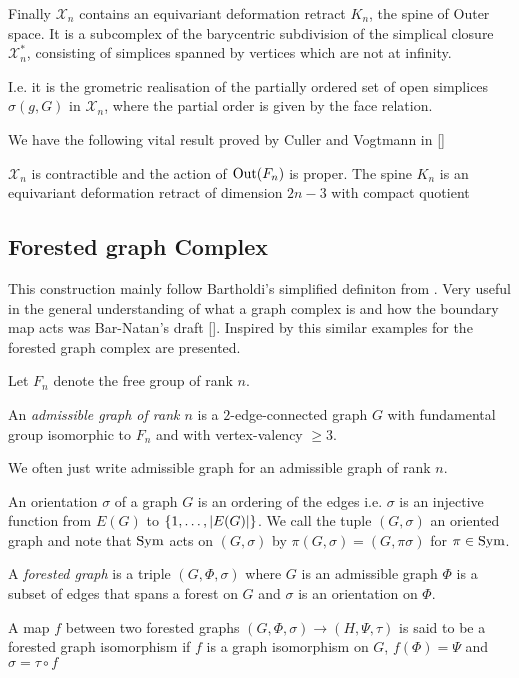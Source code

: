  Finally $\mathcal{X}_{n}$ contains an equivariant deformation retract $K_{n}$, the spine of Outer space.
 It is a subcomplex of the barycentric subdivision of the simplical closure $\mathcal{X}_{n}^{*}$, consisting of simplices spanned by vertices which are not at infinity.

 I.e. it is the grometric realisation of the partially ordered set of open simplices $\sigma(g,G)$ in $\mathcal{X}_{n}$, where 
 the partial order is given by the face relation.

 We have the following vital result proved by Culler and Vogtmann in []
 \begin{theorem}
	 $\mathcal{X}_{n}$ is contractible and the action of $\operatorname{Out}(F_{n})$ is proper.
	 The spine $K_{n}$ is an equivariant deformation retract of dimension $2 n - 3$ with compact quotient
 \end{theorem}

\subsection{Forested graph Complex}
This construction mainly follow Bartholdi's simplified definiton from \cite{bartholdi16}.
Very useful in the general understanding of  what a graph complex is and how the boundary map acts was Bar-Natan's draft [].
Inspired by this similar examples for the forested graph complex are presented.

Let $F_{n}$ denote the free group of rank $n.$
\begin{definition}
	An \emph{admissible graph of rank $n$} is a $2$-edge-connected graph $G$ with fundamental group isomorphic to $F_{n}$ and with vertex-valency $\geq 3$.
\end{definition}


We often just write admissible graph for an admissible graph of rank $n$.

\begin{definition}
	An orientation $\sigma$ of a graph $G$ is an ordering of the edges i.e. $\sigma$ is an injective function from $E(G)$ to $\{1,\ldots,\abs{E(G)}\}$.
	We call the tuple $(G,\sigma)$ an oriented graph and note that $\operatorname{Sym}$ acts on $(G,\sigma)$ by $\pi (G,\sigma) = (G,\pi \sigma)$ for $\pi \in \operatorname{Sym}$.
\end{definition}

\begin{definition}
	A \emph{forested graph} is a triple $(G,\Phi,\sigma)$ where $G$ is an admissible graph $\Phi$ is a subset of edges that spans a forest on $G$ and 
	$\sigma$ is an orientation on $\Phi$.

	A map $f$ between two forested graphs $(G,\Phi, \sigma) \to (H,\Psi, \tau)$ is said to be a forested graph isomorphism if 
	$f$ is a graph isomorphism on $G$,  $f(\Phi) = \Psi$ and $\sigma = \tau \circ f $
\end{definition}

